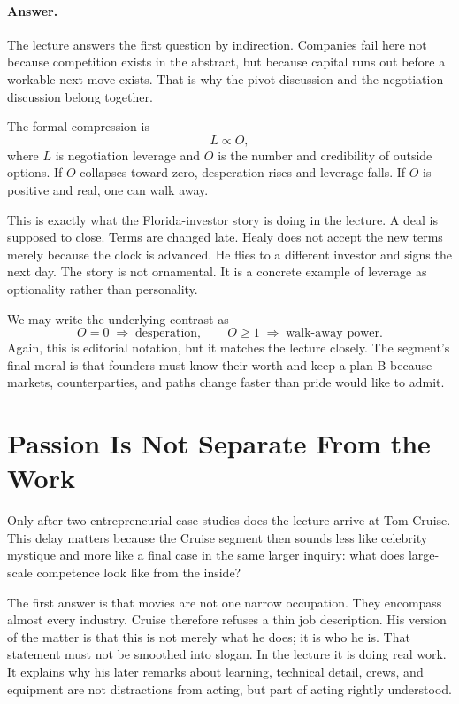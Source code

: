 \paragraph{Answer.} The lecture answers the first question by indirection. Companies fail here not because competition exists in the abstract, but because capital runs out before a workable next move exists. That is why the pivot discussion and the negotiation discussion belong together.

The formal compression is
\begin{equation}
L \propto O,
\end{equation}
where \(L\) is negotiation leverage and \(O\) is the number and credibility of outside options. If \(O\) collapses toward zero, desperation rises and leverage falls. If \(O\) is positive and real, one can walk away.

This is exactly what the Florida-investor story is doing in the lecture. A deal is supposed to close. Terms are changed late. Healy does not accept the new terms merely because the clock is advanced. He flies to a different investor and signs the next day. The story is not ornamental. It is a concrete example of leverage as optionality rather than personality.

We may write the underlying contrast as
\begin{equation}
O=0 \;\Longrightarrow\; \text{desperation},
\qquad
O\ge 1 \;\Longrightarrow\; \text{walk-away power}.
\end{equation}
Again, this is editorial notation, but it matches the lecture closely. The segment's final moral is that founders must know their worth and keep a plan B because markets, counterparties, and paths change faster than pride would like to admit.

\section{Passion Is Not Separate From the Work}

Only after two entrepreneurial case studies does the lecture arrive at Tom Cruise. This delay matters because the Cruise segment then sounds less like celebrity mystique and more like a final case in the same larger inquiry: what does large-scale competence look like from the inside?

The first answer is that movies are not one narrow occupation. They encompass almost every industry. Cruise therefore refuses a thin job description. His version of the matter is that this is not merely what he does; it is who he is. That statement must not be smoothed into slogan. In the lecture it is doing real work. It explains why his later remarks about learning, technical detail, crews, and equipment are not distractions from acting, but part of acting rightly understood.

